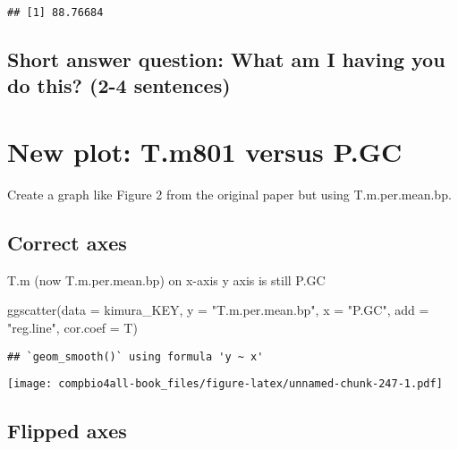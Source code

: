\documentclass[
]{book}
\newenvironment{Shaded}{\begin{snugshade}}{\end{snugshade}}
\newcommand{\AttributeTok}[1]{\textcolor[rgb]{0.77,0.63,0.00}{#1}}
\newcommand{\FunctionTok}[1]{\textcolor[rgb]{0.00,0.00,0.00}{#1}}
\newcommand{\NormalTok}[1]{#1}
\newcommand{\StringTok}[1]{\textcolor[rgb]{0.31,0.60,0.02}{#1}}
\begin{document}
\begin{verbatim}
## [1] 88.76684
\end{verbatim}

\hypertarget{short-answer-question-what-am-i-having-you-do-this-2-4-sentences-1}{%
\subsection{Short answer question: What am I having you do this? (2-4 sentences)}\label{short-answer-question-what-am-i-having-you-do-this-2-4-sentences-1}}

\hypertarget{new-plot-t.m801-versus-p.gc}{%
\section{New plot: T.m801 versus P.GC}\label{new-plot-t.m801-versus-p.gc}}

Create a graph like Figure 2 from the original paper but using T.m.per.mean.bp.

\hypertarget{correct-axes}{%
\subsection{Correct axes}\label{correct-axes}}

T.m (now T.m.per.mean.bp) on x-axis
y axis is still P.GC

\begin{Shaded}
\begin{Highlighting}[]
\FunctionTok{ggscatter}\NormalTok{(}\AttributeTok{data =}\NormalTok{ kimura\_KEY,}
         \AttributeTok{y =} \StringTok{"T.m.per.mean.bp"}\NormalTok{,}
         \AttributeTok{x =} \StringTok{"P.GC"}\NormalTok{,}
         \AttributeTok{add =} \StringTok{"reg.line"}\NormalTok{,}
         \AttributeTok{cor.coef =}\NormalTok{ T)}
\end{Highlighting}
\end{Shaded}

\begin{verbatim}
## `geom_smooth()` using formula 'y ~ x'
\end{verbatim}

\texttt{[image: compbio4all-book\_files/figure-latex/unnamed-chunk-247-1.pdf]}

\hypertarget{flipped-axes}{%
\subsection{Flipped axes}\label{flipped-axes}}
\end{document}
